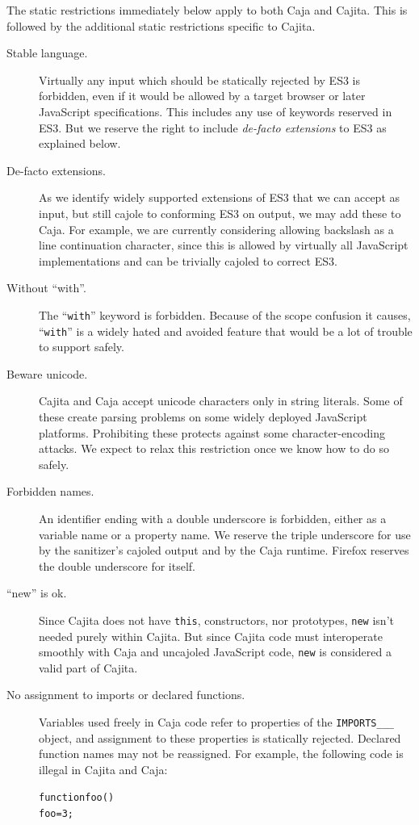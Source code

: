 \documentclass[letterpaper,twocolumn,10pt]{article}
\newcommand{\code}[1]{{\tt {#1}}}              %
\begin{document}
The static restrictions immediately below apply to both Caja and Cajita. This 
is followed by the additional static restrictions specific to Cajita.

\begin{description}

    \item[Stable language.] Virtually any input which should be statically 
    rejected by ES3 is forbidden, even if it would be allowed by a target 
    browser or later JavaScript specifications. This includes any use of 
    keywords reserved in ES3. But we reserve the right to include 
    \emph{de-facto extensions} to ES3 as explained below.
    
    \item[De-facto extensions.] As we identify widely supported extensions of 
    ES3 that we can accept as input, but still cajole to conforming ES3 on 
    output, we may add these to Caja. For example, we are currently 
    considering allowing backslash as a line continuation character, since 
    this is allowed by virtually all JavaScript implementations and can be 
    trivially cajoled to correct ES3.

    \item[Without ``with''.] The ``\code{with}'' keyword is forbidden. 
    Because of the scope confusion it causes, ``\code{with}'' is a widely 
    hated and avoided feature that would be a lot of trouble to support 
    safely.

    \item[Beware unicode.] Cajita and Caja accept unicode characters only in 
    string literals.  Some of these create parsing 
    problems on some widely deployed JavaScript platforms. Prohibiting these 
    protects against some character-encoding attacks. We expect to relax this 
    restriction once we know how to do so safely.

    \item[Forbidden names.] An identifier ending with a double underscore is 
    forbidden, either as a variable name or a property name. We reserve the 
    triple underscore for use by the sanitizer's cajoled output and by the 
    Caja runtime. Firefox reserves the double underscore for itself.
    
    \item[``new'' is ok.] Since Cajita does not have \code{this}, 
    constructors, nor prototypes, \code{new} isn't needed purely within 
    Cajita. But since Cajita code must interoperate smoothly with Caja and 
    uncajoled JavaScript code, \code{new} is considered a valid part of 
    Cajita.
    
    \item[No assignment to imports or declared functions.]  Variables used freely
    in Caja code refer to properties of the \code{IMPORTS\_\_\_} object, and
    assignment to these properties is statically rejected.  Declared function names
    may not be reassigned.  For example, the following code is illegal in Cajita
    and Caja:
\begin{alltt}
function foo() {}
foo = 3;
\end{alltt}
    
        
\end{description}
\end{document}
